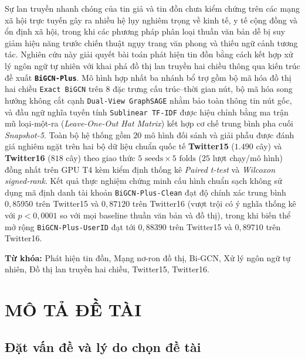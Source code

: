 \documentclass[11pt,a4paper]{extreport}
\begin{document}
Sự lan truyền nhanh chóng của tin giả và tin đồn chưa kiểm chứng trên các mạng xã hội trực tuyến gây ra nhiều hệ lụy nghiêm trọng về kinh tế, y tế cộng đồng và ổn định xã hội, trong khi các phương pháp phân loại thuần văn bản dễ bị suy giảm hiệu năng trước chiến thuật ngụy trang văn phong và thiếu ngữ cảnh tương tác. Nghiên cứu này giải quyết bài toán phát hiện tin đồn bằng cách kết hợp xử lý ngôn ngữ tự nhiên với khai phá đồ thị lan truyền hai chiều thông qua kiến trúc đề xuất \textbf{\texttt{BiGCN-Plus}}. Mô hình hợp nhất ba nhánh bổ trợ gồm bộ mã hóa đồ thị hai chiều \texttt{Exact BiGCN} trên $8$ đặc trưng cấu trúc--thời gian nút, bộ mã hóa song hướng không cắt cạnh \texttt{Dual-View GraphSAGE} nhằm bảo toàn thông tin nút gốc, và đầu ngữ nghĩa tuyến tính \texttt{Sublinear TF-IDF} được hiệu chỉnh bằng ma trận mũ loại-một-ra (\textit{Leave-One-Out Hat Matrix}) kết hợp cơ chế trung bình pha cuối \textit{Snapshot-5}. Toàn bộ hệ thống gồm $20$ mô hình đối sánh và giải phẫu được đánh giá nghiêm ngặt trên hai bộ dữ liệu chuẩn quốc tế \textbf{Twitter15} ($1.490$ cây) và \textbf{Twitter16} ($818$ cây) theo giao thức $5\text{ seeds} \times 5\text{ folds}$ ($25$ lượt chạy/mô hình) đồng nhất trên GPU T4 kèm kiểm định thống kê \textit{Paired t-test} và \textit{Wilcoxon signed-rank}. Kết quả thực nghiệm chứng minh cấu hình chuẩn sạch không sử dụng mã định danh tài khoản \texttt{BiGCN-Plus-Clean} đạt độ chính xác trung bình $0{,}85950$ trên Twitter15 và $0{,}87120$ trên Twitter16 (vượt trội có ý nghĩa thống kê với $p < 0{,}0001$ so với mọi baseline thuần văn bản và đồ thị), trong khi biến thể mở rộng \texttt{BiGCN-Plus-UserID} đạt tới $0{,}88390$ trên Twitter15 và $0{,}89710$ trên Twitter16.

\textbf{Từ khóa:} Phát hiện tin đồn, Mạng nơ-ron đồ thị, Bi-GCN, Xử lý ngôn ngữ tự nhiên, Đồ thị lan truyền hai chiều, Twitter15, Twitter16.

\clearpage
{}
\setcounter{page}{1}

\chapter{MÔ TẢ ĐỀ TÀI}

\section{Đặt vấn đề và lý do chọn đề tài}
\end{document}
